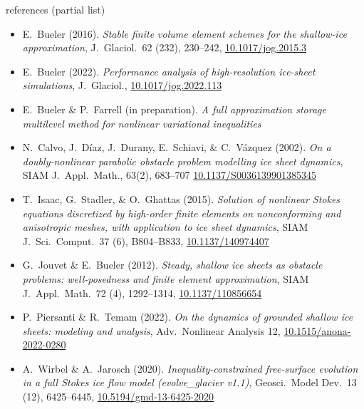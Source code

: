 \documentclass[svgnames,
               hyperref={colorlinks,citecolor=DeepPink4,linkcolor=FireBrick,urlcolor=Maroon},
               usepdftitle=false]  %
               {beamer}
\begin{document}
\begin{frame}{references (partial list)}

{\scriptsize
\begin{itemize}
\item E.~Bueler (2016). \emph{Stable finite volume element schemes for the shallow-ice approximation}, J.~Glaciol.~62 (232), 230--242, \href{https://doi.org/10.1017/jog.2015.3}{10.1017/jog.2015.3}
\item E.~Bueler (2022). \emph{Performance analysis of high-resolution ice-sheet simulations}, J.~Glaciol., \href{https://doi.org/10.1017/jog.2022.113}{10.1017/jog.2022.113}
\item E.~Bueler \& P.~Farrell (in preparation). \emph{A full approximation storage multilevel method for nonlinear variational inequalities}
\item N.~Calvo, J.~D\'iaz, J.~Durany, E.~Schiavi, \& C.~V\'azquez (2002). \emph{On a doubly-nonlinear parabolic obstacle problem modelling ice sheet dynamics}, SIAM J.~Appl.~Math., 63(2), 683--707 \href{https://doi.org/10.1137/S0036139901385345}{10.1137/S0036139901385345}
\item T.~Isaac, G.~Stadler, \& O.~Ghattas (2015). \emph{Solution of nonlinear Stokes equations discretized by high-order finite elements on nonconforming and anisotropic meshes, with application to ice sheet dynamics}, SIAM J.~Sci.~Comput.~37 (6), B804--B833, \href{https://doi.org/10.1137/140974407}{10.1137/140974407}
\item G.~Jouvet \& E.~Bueler (2012). \emph{Steady, shallow ice sheets as obstacle problems: well-posedness and finite element approximation}, SIAM J.~Appl.~Math.~72 (4), 1292--1314, \href{https://doi.org/10.1137/110856654}{10.1137/110856654}
\item P.~Piersanti \& R.~Temam (2022). \emph{On the dynamics of grounded shallow ice
sheets: modeling and analysis}, Adv.~Nonlinear Analysis 12, \href{https://doi.org/10.1515/anona-2022-0280}{10.1515/anona-2022-0280}
\item A.~Wirbel \& A.~Jarosch (2020). \emph{Inequality-constrained free-surface evolution in a full Stokes ice flow model (evolve\_glacier v1.1)}, Geosci.~Model Dev.~13 (12), 6425--6445, \href{https://doi.org/10.5194/gmd-13-6425-2020}{10.5194/gmd-13-6425-2020}
\end{itemize}
}
\end{frame}
\end{document}

